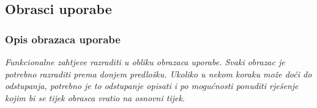 			\eject 
			
			
				
			\subsection{Obrasci uporabe}
								
				\subsubsection{Opis obrazaca uporabe}
					\textit{Funkcionalne zahtjeve razraditi u obliku obrazaca uporabe. Svaki obrazac je potrebno razraditi prema donjem predlošku. Ukoliko u nekom koraku može doći do odstupanja, potrebno je to odstupanje opisati i po mogućnosti ponuditi rješenje kojim bi se tijek obrasca vratio na osnovni tijek.}\\
					

